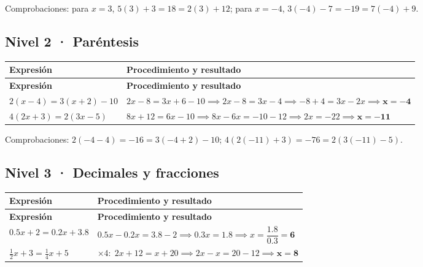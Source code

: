 \documentclass[spanish,letterpaper,oneside]{article}
\begin{document}
Comprobaciones: para $x=3$, $5(3)+3=18=2(3)+12$; para $x=-4$, $3(-4)-7=-19=7(-4)+9$.
\subsection*{Nivel 2 · Paréntesis}


{\small{}\renewcommand{\arraystretch}{1.32}
\begin{longtable}{|>{\raggedright\arraybackslash}p{}|>{\raggedright\arraybackslash}p{}|}\hline
\rowcolor{iiiepePale} \textbf{Expresión} & \textbf{Procedimiento y resultado} \\\hline
\endfirsthead
\hline
\rowcolor{iiiepePale} \textbf{Expresión} & \textbf{Procedimiento y resultado} \\\hline
\endhead
$2(x-4)=3(x+2)-10$ & $2x-8 = 3x+6-10 \implies 2x-8 = 3x-4 \implies -8+4 = 3x-2x \implies \mathbf{x=-4}$ \\\hline
$4(2x+3)=2(3x-5)$ & $8x+12 = 6x-10 \implies 8x-6x = -10-12 \implies 2x = -22 \implies \mathbf{x=-11}$ \\\hline
\end{longtable}}


Comprobaciones: $2(-4-4)=-16=3(-4+2)-10$; $4(2(-11)+3)=-76=2(3(-11)-5)$.
\subsection*{Nivel 3 · Decimales y fracciones}


{\small{}\renewcommand{\arraystretch}{1.32}
\begin{longtable}{|>{\raggedright\arraybackslash}p{}|>{\raggedright\arraybackslash}p{}|}\hline
\rowcolor{iiiepePale} \textbf{Expresión} & \textbf{Procedimiento y resultado} \\\hline
\endfirsthead
\hline
\rowcolor{iiiepePale} \textbf{Expresión} & \textbf{Procedimiento y resultado} \\\hline
\endhead
$0.5x+2=0.2x+3.8$ & $0.5x-0.2x = 3.8-2 \implies 0.3x = 1.8 \implies x = \dfrac{1.8}{0.3} = \mathbf{6}$ \\\hline
$\frac12x+3=\frac14x+5$ & $\times 4:\; 2x+12 = x+20 \implies 2x-x = 20-12 \implies \mathbf{x=8}$ \\\hline
\end{longtable}}
\end{document}

